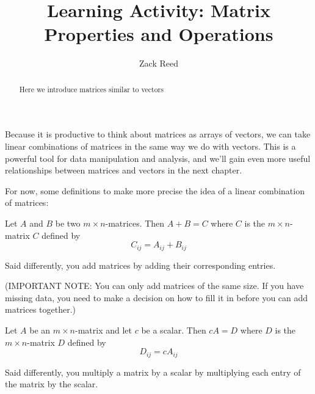 \documentclass{ximera}
\author{Zack Reed} %
\title{Learning Activity: Matrix Properties and Operations}
\begin{document}
\begin{abstract}
Here we introduce matrices similar to vectors
\end{abstract}
\maketitle
 
\begin{exploration}

\begin{remark}

  Because it is productive to think about matrices as arrays of vectors, we can take linear combinations of matrices in the same way we do with vectors. This is a powerful tool for data manipulation and analysis, and we'll gain even more useful relationships between matrices and vectors in the next chapter.

  For now, some definitions to make more precise the idea of a linear combination of matrices:

  \begin{definition}
    Let $A$ and $B$ be two
    $m\times n$-matrices. Then $A+B=C$%
     where $C$ is the $m\times n$-matrix
    $C$ defined by
    \begin{equation*}
      C_{ij}=A_{ij}+B_{ij}
    \end{equation*}

    Said differently, you add matrices by adding their corresponding entries.

    (IMPORTANT NOTE: You can only add matrices of the same size. If you have missing data, you need to make a decision on how to fill it in before you can add matrices together.)
  \end{definition}

  \begin{definition}
    Let $A$ be an $m\times n$-matrix and let $c$ be a scalar. Then $cA=D$%
     where $D$ is the $m\times n$-matrix
    $D$ defined by
    \begin{equation*}
      D_{ij}=cA_{ij}
    \end{equation*}

    Said differently, you multiply a matrix by a scalar by multiplying each entry of the matrix by the scalar.
  \end{definition}


\end{remark}
\end{exploration}
\end{document}
